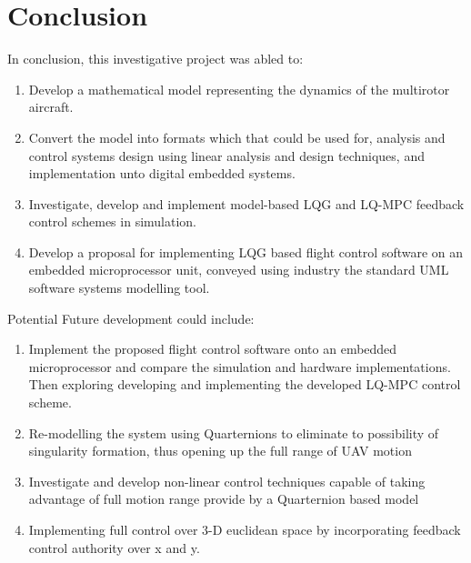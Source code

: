\documentclass[12pt,a4paper,twoside]{report}
\begin{document}
	\newpage
	
	\chapter{Conclusion}
		
		In conclusion, this investigative project was abled to:
		\begin{enumerate}
			\item
				Develop a mathematical model representing the dynamics of the multirotor aircraft.
			\item
				Convert the model into formats which that could be used for, analysis and control systems design using linear analysis and design techniques, and implementation unto digital embedded systems. 
			\item
				Investigate, develop and implement model-based LQG and LQ-MPC feedback control schemes in simulation.
			\item
				Develop a proposal for implementing LQG based flight control software on an embedded microprocessor unit, conveyed using industry the standard UML software systems modelling tool.
		\end{enumerate}
		Potential Future development could include:
		\begin{enumerate}
			\item
				Implement the proposed flight control software onto an embedded microprocessor and compare the simulation and hardware implementations. Then exploring developing and implementing the developed LQ-MPC control scheme.
			\item
				Re-modelling the system using Quarternions to eliminate to possibility of singularity formation, thus opening up the full range of UAV motion
			\item	
				Investigate and develop non-linear control techniques capable of taking advantage of full motion range provide by a Quarternion based model 
			\item	
				Implementing full control over 3-D euclidean space by incorporating feedback control authority over x and y.
			\end{enumerate}
	
	\newpage
						
				
	
				
\end{document}

